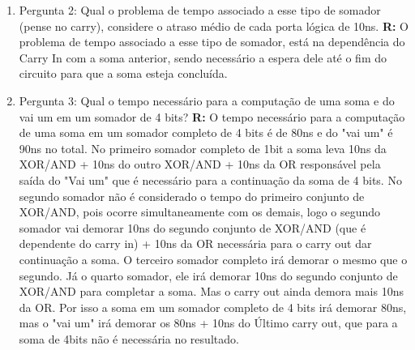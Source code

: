 \documentclass[a4paper,11pt]{article}
\begin{document}
\begin{enumerate}
\begin{enumerate}
            \item{Pergunta 2: Qual o problema de tempo associado a esse tipo de somador (pense no carry), considere o atraso médio de cada porta lógica de 10ns.}
                \newline
                \textbf{R:} O problema de tempo associado a esse tipo de somador, está na dependência do Carry
                In com a soma anterior, sendo necessário a espera dele até o fim do circuito para que a soma
                esteja concluída.
                \bigskip

            \item{Pergunta 3: Qual o tempo necessário para a computação de uma soma e do vai um em um somador
                    de 4 bits?}
                \newline
                \textbf{R:} O tempo necessário para a computação de uma soma em um somador completo de 4 bits
                é de 80ns e do "vai um" é 90ns no total.
                \newline
                No primeiro somador completo de 1bit a soma leva 10ns
                da XOR/AND + 10ns do outro XOR/AND + 10ns da OR responsável pela saída do "Vai um" que é necessário
                para a continuação da soma de 4 bits.
                \newline
                No segundo somador não é considerado o tempo do primeiro
                conjunto de XOR/AND, pois ocorre simultaneamente com os demais, logo o segundo somador vai
                demorar 10ns do segundo conjunto de XOR/AND (que é dependente do carry in) + 10ns da OR
                necessária para o carry out dar continuação a soma.
                \newline
                O terceiro somador completo irá demorar o mesmo que o segundo.
                \newline
                Já o quarto somador, ele irá demorar 10ns do segundo conjunto de XOR/AND para completar a
                soma. Mas o carry out ainda demora mais 10ns da OR.
                \newline
                Por isso a soma em um somador completo de
                4 bits irá demorar 80ns, mas o "vai um" irá  demorar os 80ns + 10ns do Último carry out, que
                para a soma de 4bits não é necessária no resultado.
                \bigskip


\end{enumerate}
\end{enumerate}
\end{document}
